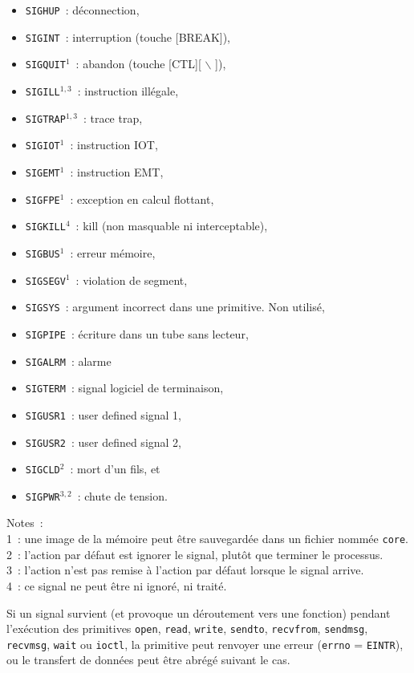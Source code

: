 \documentclass [twoside] {report}
\begin{document}
\begin {itemize}
    \label {ps:sigv7}
    \item \texttt {SIGHUP}~: déconnection,
    \item \texttt {SIGINT}~: interruption (touche [BREAK]),
    \item \texttt {SIGQUIT}{$^1$}~: abandon (touche [CTL]{[ $\backslash$ ]}),
    \item \texttt {SIGILL}{$^{1, 3}$}~: instruction illégale,
    \item \texttt {SIGTRAP}{$^{1, 3}$}~: trace trap,
    \item \texttt {SIGIOT}{$^1$}~: instruction IOT,
    \item \texttt {SIGEMT}{$^1$}~: instruction EMT,
    \item \texttt {SIGFPE}{$^1$}~: exception en calcul flottant,
    \item \texttt {SIGKILL}{$^4$}~: kill (non masquable ni interceptable),
    \item \texttt {SIGBUS}{$^1$}~: erreur mémoire,
    \item \texttt {SIGSEGV}{$^1$}~: violation de segment,
    \item \texttt {SIGSYS}~: argument incorrect dans une primitive. Non utilisé,
    \item \texttt {SIGPIPE}~: écriture dans un tube sans lecteur,
    \item \texttt {SIGALRM}~: alarme
    \item \texttt {SIGTERM}~: signal logiciel de terminaison,
    \item \texttt {SIGUSR1}~: user defined signal 1,
    \item \texttt {SIGUSR2}~: user defined signal 2,
    \item \texttt {SIGCLD}{$^2$}~: mort d'un fils, et
    \item \texttt {SIGPWR}{$^{3, 2}$}~: chute de tension.
\end {itemize}

Notes~: \\
1~: une image de la mémoire peut être sauvegardée dans
un fichier nommée \texttt {core}. \\
2~: l'action par défaut est ignorer le
signal, plutôt que terminer le processus. \\
3~: l'action n'est pas remise à l'action par
défaut lorsque le signal arrive. \\
4~: ce signal ne peut être ni ignoré, ni traité.

Si un signal survient (et provoque un déroutement
vers une fonction) pendant l'exécution des primitives
\texttt {open},
\texttt {read},
\texttt {write},
\texttt {sendto},
\texttt {recvfrom},
\texttt {sendmsg},
\texttt {recvmsg},
\texttt {wait} ou
\texttt {ioctl},
la primitive peut renvoyer une erreur (\texttt {errno} = \texttt {EINTR}),
ou le transfert de données peut être abrégé suivant le cas.
\end{document}
